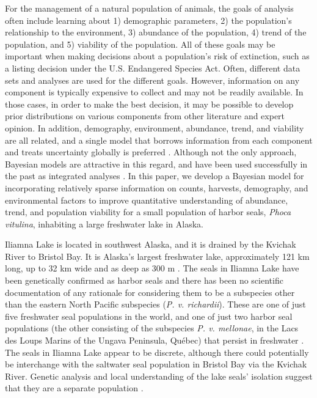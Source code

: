 \documentclass[12pt, titlepage]{article}\usepackage[]{graphicx}\usepackage[]{color}
\begin{document}
For the management of a natural population of animals, the goals of analysis often include learning about 1) demographic parameters, 2) the population's relationship to the environment, 3) abundance of the population, 4) trend of the population, and 5) viability of the population. All of these goals may be important when making decisions about a population's risk of extinction, such as a listing decision under the U.S. Endangered Species Act. Often, different data sets and analyses are used for the different goals.  However, information on any component is typically expensive to collect and may not be readily available.  In those cases, in order to make the best decision, it may be possible to develop prior distributions on various components from other literature and expert opinion.  In addition, demography, environment, abundance, trend, and viability are all related, and a single model that borrows information from each component and treats uncertainty globally is preferred \citep{Good:meth:2004}.  Although not the only approach, Bayesian models are attractive in this regard, and have been used successfully in the past as integrated analyses \citep[e.g.,][]{Good:pred:2002, Wade:Baye:2002, Maun:popu:2004}. In this paper, we develop a Bayesian model for incorporating relatively sparse information on counts, harvests, demography, and environmental factors to improve quantitative understanding of abundance, trend, and population viability for a small population of harbor seals, \emph{Phoca vitulina}, inhabiting a large freshwater lake in Alaska.

Iliamna Lake is located in southwest Alaska, and it is drained by the Kvichak River to Bristol Bay. It is Alaska's largest freshwater lake, approximately 121 km long, up to 32 km wide and as deep as 300 m \citep{Ande:bath:1969, Haus:Alle:Rich:Quin:resi:2008}.  The seals in Iliamna Lake have been genetically confirmed as harbor seals and there has been no scientific documentation of any rationale for considering them to be a subspecies other than the eastern North Pacific subspecies (\emph{P. v. richardii})\citep{Burn:Van:With:Hole:Asko:inte:2016}. These are one of just five freshwater seal populations in the world, and one of just two harbor seal populations (the other consisting of the subspecies \emph{P. v. mellonae}, in the Lacs des Loups Marins of the Ungava Peninsula, Qu\'{e}bec) that persist in freshwater \citep{Smit:Hobs:Koop:Lavi:dist:1996}. The seals in Iliamna Lake appear to be discrete, although there could potentially be interchange with the saltwater seal population in Bristol Bay via the Kvichak River. Genetic analysis and local understanding of the lake seals' isolation suggest that they are a separate population \citep{Burn:Van:With:Hole:Asko:inte:2016,NMFS:enda:2016}.
\end{document}
